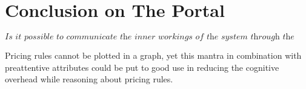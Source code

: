 
\section{Conclusion on The Portal}
\[\textit{Is it possible to communicate the inner workings of the system through the user interface?}\]\hfill

Pricing rules cannot be plotted in a graph, yet this mantra in combination with preattentive attributes could be put to good use in reducing the cognitive overhead while reasoning about pricing rules.






